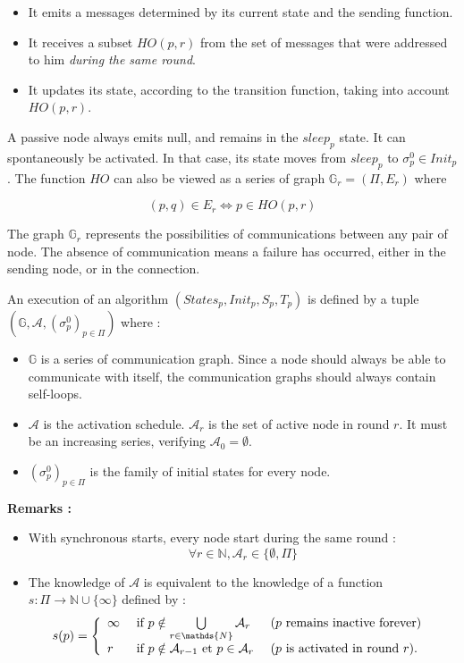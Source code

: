 \documentclass{article}
\begin{document}
\begin{itemize}
	\item It emits a messages determined by its current state and the sending function.
	\item It receives a subset $HO(p,r)$ from the set of messages that were addressed to him
		\textit{during the same round}.
	\item It updates its state, according to the transition function, taking into account $HO(p,r)$.
\end{itemize}

A passive node always emits null, and remains in the $sleep_p$ state.
It can spontaneously be activated. In that case, its state moves from $sleep_p$ to $\sigma^0_p \in Init_p$.
The function $HO$ can also be viewed as a series of graph $\mathds{G}_r = (\Pi, E_r)$ where

$$(p, q) \in E_r \Leftrightarrow p \in HO(p, r)$$

The graph $\mathds{G}_r$ represents the possibilities of communications between any pair of node.
The absence of communication means a failure has occurred, either in the sending node, or in the connection.

An execution of an algorithm $(States_p, Init_p, S_p, T_p)$ is defined by a tuple
$(\mathds{G}, \mathcal{A}, (\sigma^0_p)_{p \in \Pi})$ where :

\begin{itemize}
	\item $\mathds{G}$ is a series of communication graph. Since a node should always be able to communicate 
		with itself, the communication graphs should always contain self-loops.
	\item $\mathcal{A}$ is the activation schedule. $\mathcal{A}_r$ is the set of active node in round $r$.
		It must be an increasing series, verifying $\mathcal{A}_0 = \emptyset$.
	\item $(\sigma^0_p)_{p \in \Pi}$ is the family of initial states for every node.
\end{itemize}

\textbf{Remarks :}

\begin{itemize}
	\item With synchronous starts, every node start during the same round : 
		$$\forall r \in \mathds{N}, \mathcal{A}_r \in \{\emptyset, \Pi\}$$

	\item The knowledge of $\mathcal{A}$ is equivalent to the knowledge of a function
		$s : \Pi \rightarrow \mathds{N} \cup \{\infty\}$ defined by :
		$$s(p) = \left \{ \begin{array}{l ll}
		  \infty & \mbox{ if  } p \notin \bigcup\limits_{r \in \mathds{N}}  \mathcal{A}_r & 
			  \mbox { ($p$ remains inactive forever) } \\
		  r  & \mbox{ if  } p \notin \mathcal{A}_{r-1} \mbox{ et } p \in \mathcal{A}_{r}  &
			  \mbox{ ($p$ is activated in round $r$)}.
		  \end{array} \right.$$

\end{itemize}
\end{document}

